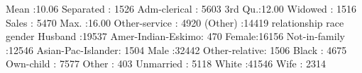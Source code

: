 \documentclass[
  11pt,
]{book}
\makeatletter
\newenvironment{Shaded}{}{}
\newcommand{\ControlFlowTok}[1]{\textcolor[rgb]{0.07,0.07,0.07}{#1}}
\newcommand{\DecValTok}[1]{#1}
\newcommand{\FloatTok}[1]{#1}
\newcommand{\NormalTok}[1]{#1}
\newcommand{\SpecialCharTok}[1]{\textcolor[rgb]{0.39,0.39,0.39}{#1}}
\newenvironment{kframe}{%
\medskip{}
\setlength{\fboxsep}{.8em}
 \def\at@end@of@kframe{}%
 \ifinner\ifhmode%
  \def\at@end@of@kframe{\end{minipage}}%
  \begin{minipage}{\columnwidth}%
 \fi\fi%
 \def\FrameCommand##1{\hskip\@totalleftmargin \hskip-\fboxsep
 \colorbox{shadecolor}{##1}\hskip-\fboxsep
     \hskip-\linewidth \hskip-\@totalleftmargin \hskip\columnwidth}%
 \MakeFramed {\advance\hsize-\width
   \@totalleftmargin\z@ \linewidth\hsize
   \@setminipage}}%
 {\par\unskip\endMakeFramed%
 \at@end@of@kframe}
\renewenvironment{Shaded}{\begin{kframe}}{\end{kframe}}
\theoremstyle{definition}
\theoremstyle{definition}
\theoremstyle{definition}
\theoremstyle{definition}
\theoremstyle{remark}
\makeatother
\begin{document}
\begin{Shaded}
\begin{Highlighting}[]
\NormalTok{    Mean   }\SpecialCharTok{:}\FloatTok{10.06}\NormalTok{   Separated    }\SpecialCharTok{:} \DecValTok{1526}\NormalTok{   Adm}\SpecialCharTok{{-}}\NormalTok{clerical   }\SpecialCharTok{:} \DecValTok{5603}  
    \DecValTok{3}\NormalTok{rd Qu.}\SpecialCharTok{:}\FloatTok{12.00}\NormalTok{   Widowed      }\SpecialCharTok{:} \DecValTok{1516}\NormalTok{   Sales          }\SpecialCharTok{:} \DecValTok{5470}  
\NormalTok{    Max.   }\SpecialCharTok{:}\FloatTok{16.00}\NormalTok{                         Other}\SpecialCharTok{{-}}\NormalTok{service  }\SpecialCharTok{:} \DecValTok{4920}  
\NormalTok{                                          (Other)        }\SpecialCharTok{:}\DecValTok{14419}  
\NormalTok{            relationship                   race          gender     }
\NormalTok{    Husband       }\SpecialCharTok{:}\DecValTok{19537}\NormalTok{   Amer}\SpecialCharTok{{-}}\NormalTok{Indian}\SpecialCharTok{{-}}\NormalTok{Eskimo}\SpecialCharTok{:}  \DecValTok{470}\NormalTok{   Female}\SpecialCharTok{:}\DecValTok{16156}  
\NormalTok{    Not}\SpecialCharTok{{-}}\ControlFlowTok{in}\SpecialCharTok{{-}}\NormalTok{family }\SpecialCharTok{:}\DecValTok{12546}\NormalTok{   Asian}\SpecialCharTok{{-}}\NormalTok{Pac}\SpecialCharTok{{-}}\NormalTok{Islander}\SpecialCharTok{:} \DecValTok{1504}\NormalTok{   Male  }\SpecialCharTok{:}\DecValTok{32442}  
\NormalTok{    Other}\SpecialCharTok{{-}}\NormalTok{relative}\SpecialCharTok{:} \DecValTok{1506}\NormalTok{   Black             }\SpecialCharTok{:} \DecValTok{4675}                 
\NormalTok{    Own}\SpecialCharTok{{-}}\NormalTok{child     }\SpecialCharTok{:} \DecValTok{7577}\NormalTok{   Other             }\SpecialCharTok{:}  \DecValTok{403}                 
\NormalTok{    Unmarried     }\SpecialCharTok{:} \DecValTok{5118}\NormalTok{   White             }\SpecialCharTok{:}\DecValTok{41546}                 
\NormalTok{    Wife          }\SpecialCharTok{:} \DecValTok{2314}                                            
                                                                    

\end{Highlighting}
\end{Shaded}
\end{document}
